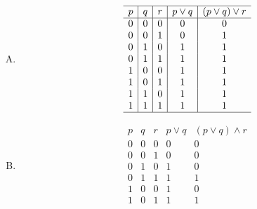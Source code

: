 {{        %
        \begin{practices}
            \begin{enumerate}[A.]
                \item
                {
                    \begin{table}[H]
                        \[
                            \begin{array}{c|c|c|c|c}
                                \hline
                                p & q & r & p \vee q & (p \vee q) \vee r \\
                                \hline
                                0 & 0 & 0 & 0 & 0 \\
                                0 & 0 & 1 & 0 & 1 \\
                                0 & 1 & 0 & 1 & 1 \\
                                0 & 1 & 1 & 1 & 1 \\
                                1 & 0 & 0 & 1 & 1 \\
                                1 & 0 & 1 & 1 & 1 \\
                                1 & 1 & 0 & 1 & 1 \\
                                1 & 1 & 1 & 1 & 1 \\
                                \hline
                            \end{array}
                        \]
                    \end{table}
                }
                \item
                {
                    \begin{table}[H]
                        \[
                            \begin{array}{c|c|c|c|c}
                                \hline
                                p & q & r & p \vee q & (p \vee q) \wedge r \\
                                \hline
                                0 & 0 & 0 & 0 & 0 \\
                                0 & 0 & 1 & 0 & 0 \\
                                0 & 1 & 0 & 1 & 0 \\
                                0 & 1 & 1 & 1 & 1 \\
                                1 & 0 & 0 & 1 & 0 \\
                                1 & 0 & 1 & 1 & 1 \\

\end{array}\]
\end{table}}
\end{enumerate}
\end{practices}}}
